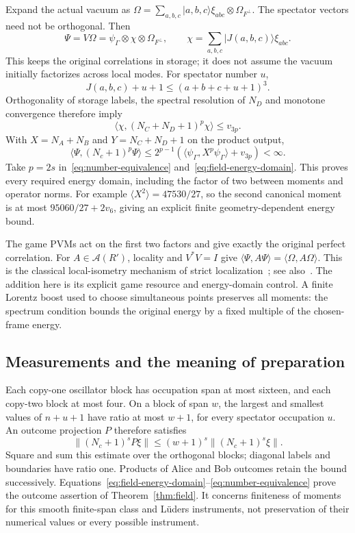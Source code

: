 Expand the actual vacuum as $\Omega=\sum_{a,b,c}|a,b,c\rangle\xi_{abc}\otimes\Omega_{F^\perp}$. The spectator vectors need not be orthogonal. Then
\[
 \Psi=V\Omega=\psi_\Gamma\otimes\chi\otimes\Omega_{F^\perp},
 \qquad \chi=\sum_{a,b,c}|J(a,b,c)\rangle\xi_{abc}.
\]
This keeps the original correlations in storage; it does not assume the vacuum initially factorizes across local modes. For spectator number $u$,
\[
 J(a,b,c)+u+1\le(a+b+c+u+1)^3.
\]
Orthogonality of storage labels, the spectral resolution of $N_D$ and monotone convergence therefore imply
\[
 \langle\chi,(N_C+N_D+1)^p\chi\rangle\le v_{3p}.
\]
With $X=N_A+N_B$ and $Y=N_C+N_D+1$ on the product output,
\[
 \langle\Psi,(N_c+1)^p\Psi\rangle
 \le2^{p-1}(\langle\psi_\Gamma,X^p\psi_\Gamma\rangle+v_{3p})<\infty.
\]
Take $p=2s$ in~\eqref{eq:number-equivalence} and~\eqref{eq:field-energy-domain}. This proves every required energy domain, including the factor of two between moments and operator norms. For example $\langle X^2\rangle=47530/27$, so the second canonical moment is at most $95060/27+2v_6$, giving an explicit finite geometry-dependent energy bound.

The game PVMs act on the first two factors and give exactly the original perfect correlation. For $A\in\mathcal A(R')$, locality and $V^*V=I$ give $\langle\Psi,A\Psi\rangle=\langle\Omega,A\Omega\rangle$. This is the classical local-isometry mechanism of strict localization~\cite[Theorem I]{Licht}; see also~\cite[Section 4]{DeBievre}. The addition here is its explicit game resource and energy-domain control. A finite Lorentz boost used to choose simultaneous points preserves all moments: the spectrum condition bounds the original energy by a fixed multiple of the chosen-frame energy.

\subsection{Measurements and the meaning of preparation}
Each copy-one oscillator block has occupation span at most sixteen, and each copy-two block at most four. On a block of span $w$, the largest and smallest values of $n+u+1$ have ratio at most $w+1$, for every spectator occupation $u$. An outcome projection $P$ therefore satisfies
\[
 \|(N_c+1)^sP\xi\|\le(w+1)^s\|(N_c+1)^s\xi\|.
\]
Square and sum this estimate over the orthogonal blocks; diagonal labels and boundaries have ratio one. Products of Alice and Bob outcomes retain the bound successively. Equations~\eqref{eq:field-energy-domain}--\eqref{eq:number-equivalence} prove the outcome assertion of Theorem~\ref{thm:field}. It concerns finiteness of moments for this smooth finite-span class and L\"uders instruments, not preservation of their numerical values or every possible instrument.

